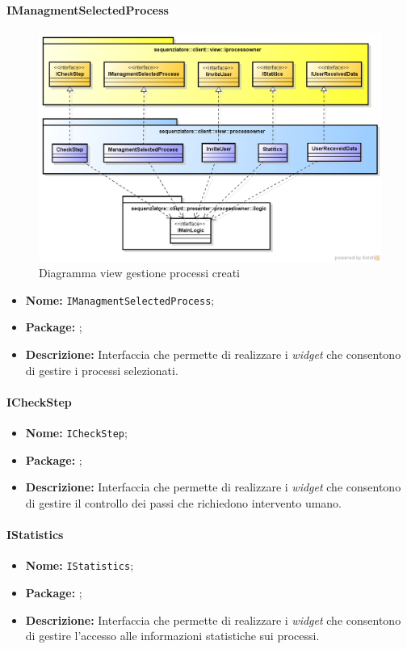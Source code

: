 \paragraph{IManagmentSelectedProcess}
\begin{figure}[H] \centering \includegraphics[width=%
\textwidth]
{./pack/PO_ManagmentSelectedProcess.png} \caption{Diagramma view gestione processi creati}
\end{figure}
\begin{itemize}
\item \textbf{Nome:} \texttt{IManagmentSelectedProcess};
\item \textbf{Package:} \texttt{\iViewAdmin{}};
\item \textbf{Descrizione:} Interfaccia che permette di realizzare i \textit{widget} che consentono di gestire i processi selezionati.
\end{itemize}

\paragraph{ICheckStep}
\begin{itemize}
\item \textbf{Nome:} \texttt{ICheckStep};
\item \textbf{Package:} \texttt{\iViewAdmin{}};
\item \textbf{Descrizione:} Interfaccia che permette di realizzare i \textit{widget} che consentono di gestire il controllo dei passi che richiedono intervento umano.
\end{itemize}

\paragraph{IStatistics}
\begin{itemize}
\item \textbf{Nome:} \texttt{IStatistics};
\item \textbf{Package:} \texttt{\iViewAdmin{}};
\item \textbf{Descrizione:} Interfaccia che permette di realizzare i \textit{widget} che consentono di gestire l'accesso alle informazioni statistiche sui processi.
\end{itemize}

